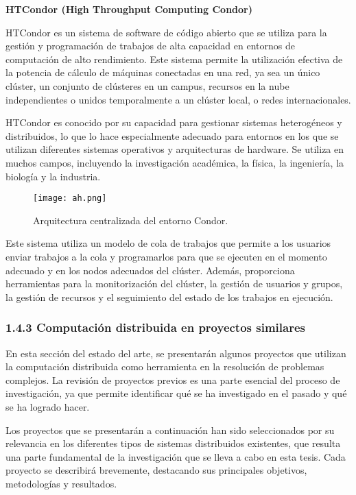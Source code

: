\begin{spacing}{1.5}
  \textbf{HTCondor (High Throughput Computing Condor)}

  HTCondor es un sistema de software de código abierto que se utiliza para la
  gestión y programación de trabajos de alta capacidad en entornos de computación
  de alto rendimiento. Este sistema permite la utilización efectiva de la
  potencia de cálculo de máquinas conectadas en una red, ya sea un único clúster,
  un conjunto de clústeres en un campus, recursos en la nube independientes o
  unidos temporalmente a un clúster local, o redes internacionales.
  \cite{DOC-HTCONDOR}

  HTCondor es conocido por su capacidad para gestionar sistemas heterogéneos y
  distribuidos, lo que lo hace especialmente adecuado para entornos en los que se
  utilizan diferentes sistemas operativos y arquitecturas de hardware. Se utiliza
  en muchos campos, incluyendo la investigación académica, la física, la
  ingeniería, la biología y la industria.

  \begin{figure}[h]
    \centering
    \texttt{[image: ah.png]}
    \caption{Arquitectura centralizada del entorno Condor.}
    \label{fig:etiqueta}
  \end{figure}

  Este sistema utiliza un modelo de cola de trabajos que permite a los usuarios
  enviar trabajos a la cola y programarlos para que se ejecuten en el momento
  adecuado y en los nodos adecuados del clúster. Además, proporciona herramientas
  para la monitorización del clúster, la gestión de usuarios y grupos, la gestión
  de recursos y el seguimiento del estado de los trabajos en ejecución.
  \cite{DEF-HTCONDOR}

  \subsubsection{1.4.3 Computación distribuida en proyectos similares}

  En esta sección del estado del arte, se presentarán algunos proyectos que
  utilizan la computación distribuida como herramienta en la resolución de
  problemas complejos. La revisión de proyectos previos es una parte esencial del
  proceso de investigación, ya que permite identificar qué se ha investigado en
  el pasado y qué se ha logrado hacer.

  Los proyectos que se presentarán a continuación han sido seleccionados por su
  relevancia en los diferentes tipos de sistemas distribuidos existentes, que
  resulta una parte fundamental de la investigación que se lleva a cabo en esta
  tesis. Cada proyecto se describirá brevemente, destacando sus principales
  objetivos, metodologías y resultados.


\end{spacing}
